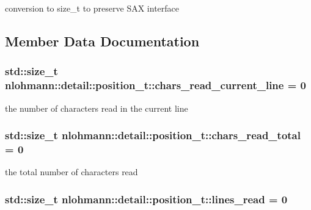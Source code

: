 conversion to size\+\_\+t to preserve S\+AX interface 



\subsection{Member Data Documentation}
\subsubsection[{\texorpdfstring{chars\+\_\+read\+\_\+current\+\_\+line}{chars_read_current_line}}]{\setlength{\rightskip}{0pt plus 5cm}std\+::size\+\_\+t nlohmann\+::detail\+::position\+\_\+t\+::chars\+\_\+read\+\_\+current\+\_\+line = 0}\hypertarget{structnlohmann_1_1detail_1_1position__t_a74df94563dd32102152ceb8c6d9041d8}{}\label{structnlohmann_1_1detail_1_1position__t_a74df94563dd32102152ceb8c6d9041d8}


the number of characters read in the current line 

\subsubsection[{\texorpdfstring{chars\+\_\+read\+\_\+total}{chars_read_total}}]{\setlength{\rightskip}{0pt plus 5cm}std\+::size\+\_\+t nlohmann\+::detail\+::position\+\_\+t\+::chars\+\_\+read\+\_\+total = 0}\hypertarget{structnlohmann_1_1detail_1_1position__t_a94cf85cd91d478c20ae143eba906ea1a}{}\label{structnlohmann_1_1detail_1_1position__t_a94cf85cd91d478c20ae143eba906ea1a}


the total number of characters read 

\subsubsection[{\texorpdfstring{lines\+\_\+read}{lines_read}}]{\setlength{\rightskip}{0pt plus 5cm}std\+::size\+\_\+t nlohmann\+::detail\+::position\+\_\+t\+::lines\+\_\+read = 0}\hypertarget{structnlohmann_1_1detail_1_1position__t_a4bbad8bc2c0d17c1b61c3ce729908b71}{}\label{structnlohmann_1_1detail_1_1position__t_a4bbad8bc2c0d17c1b61c3ce729908b71}


